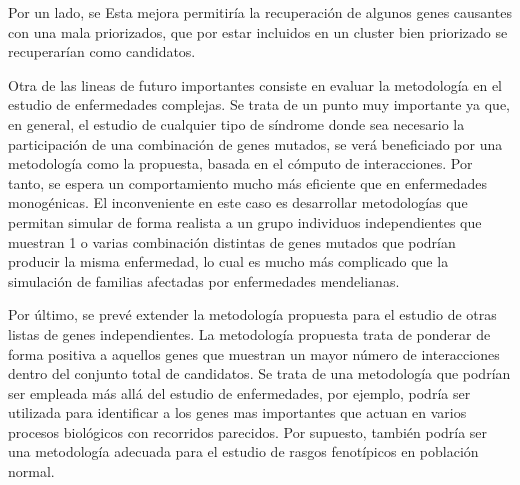 Por un lado, se Esta mejora permitiría la recuperación de algunos genes causantes con una mala priorizados, que por estar incluidos en un cluster bien priorizado se recuperarían como candidatos. 

\medskip
Otra de las lineas de futuro importantes consiste en evaluar la metodología en el estudio de enfermedades complejas. Se trata de un punto muy importante ya que, en general, el estudio de cualquier tipo de síndrome donde sea necesario la participación de una combinación de genes mutados, se verá beneficiado por una metodología como la propuesta, basada en el cómputo de interacciones. Por tanto, se espera un comportamiento mucho más eficiente que en enfermedades monogénicas. El inconveniente en este caso es desarrollar metodologías que permitan simular de forma realista a un grupo individuos independientes que muestran 1 o varias combinación distintas de genes mutados que podrían producir la misma enfermedad, lo cual es mucho más complicado que la simulación de familias afectadas por enfermedades mendelianas. 

\medskip
Por último, se prevé extender la metodología propuesta para el estudio de otras listas de genes independientes. La metodología propuesta trata de ponderar de forma positiva a aquellos genes que muestran un mayor número de interacciones dentro del conjunto total de candidatos. Se trata de una metodología que podrían ser empleada más allá del estudio de enfermedades, por ejemplo, podría ser utilizada para identificar a los genes mas importantes que actuan en varios procesos biológicos con recorridos parecidos. Por supuesto, también podría ser una metodología adecuada para el estudio de rasgos fenotípicos en población normal. 





